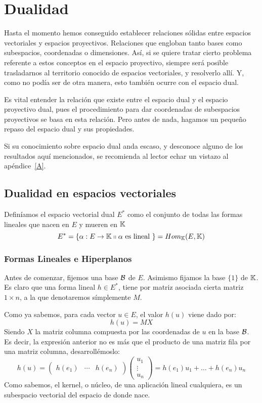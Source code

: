 \chapter{Dualidad}
\label{C2}
Hasta el momento hemos conseguido establecer relaciones sólidas entre espacios vectoriales y espacios proyectivos. Relaciones que engloban tanto bases como subespacios, coordenadas o dimensiones. Así, si se quiere tratar cierto problema referente a estos conceptos en el espacio proyectivo, siempre será posible trasladarnos al territorio conocido de espacios vectoriales, y resolverlo allí. Y, como no podía ser de otra manera, esto también ocurre con el espacio dual. 

Es vital entender la relación que existe entre el espacio dual y el espacio proyectivo dual, pues el procedimiento para dar coordenadas de subespacios proyectivos se basa en esta relación. Pero antes de nada, hagamos un pequeño repaso del espacio dual y sus propiedades.

Si su conocimiento sobre espacio dual anda escaso, y desconoce alguno de los resultados aquí mencionados, se recomienda al lector echar un vistazo al apéndice~\ref{A}.

\section{Dualidad en espacios vectoriales}
Definíamos el espacio vectorial dual $E^*$ como el conjunto de todas las formas lineales que nacen en $E$ y mueren en $\mathbb{K}$
\begin{equation}
E^*=\{\alpha:E\rightarrow \mathbb{K}\shortparallel \alpha \text{ es lineal }\}=Hom_{\mathbb{K}}(E,\mathbb{K})
\end{equation}

\subsection{Formas Lineales e Hiperplanos}
Antes de comenzar, fijemos una base $\mathcal{B}$ de $E$. Asimismo fijamos la base $\{1\}$ de $\mathbb{K}$. Es claro que una forma lineal $h\in E^*$, tiene por matriz asociada cierta matriz $1\times n$, a la que denotaremos símplemente $M$.

Como ya sabemos, para cada vector $u\in E$, el valor $h(u)$ viene dado por:
\[h(u)=MX\]
Siendo $X$ la matriz columna compuesta por las coordenadas de $u$ en la base $\mathcal{B}$. Es decir, la expresión anterior no es más que el producto de una matriz fila por una matriz columna, desarrollémoslo:
\[h(u)=\begin{pmatrix}
h(e_1) & \cdots & h(e_n)
\end{pmatrix}\begin{pmatrix}
u_1\\
\vdots\\
u_n
\end{pmatrix}=h(e_1)u_1+\dots+h(e_n)u_n\]
Como sabemos, el kernel, o núcleo, de una aplicación lineal cualquiera, es un subespacio vectorial del espacio de donde nace.

